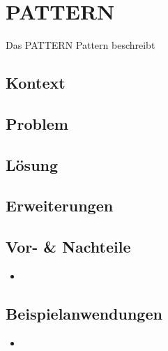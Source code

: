 \section{PATTERN}

Das PATTERN Pattern beschreibt

\subsection*{Kontext}


\subsection*{Problem}


\subsection*{Lösung}


\subsection*{Erweiterungen}


\subsection*{Vor- \& Nachteile}
\begin{itemize}
	\item 
\end{itemize}

\subsection*{Beispielanwendungen}
\begin{itemize}
	\item 
\end{itemize}